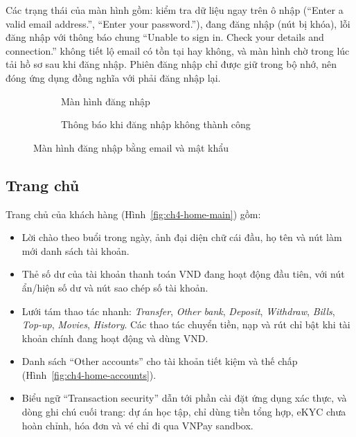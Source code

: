 Các trạng thái của màn hình gồm: kiểm tra dữ liệu ngay trên ô nhập (``Enter a valid email address.'', ``Enter your password.''), đang đăng nhập (nút bị khóa), lỗi đăng nhập với thông báo chung ``Unable to sign in. Check your details and connection.'' không tiết lộ email có tồn tại hay không, và màn hình chờ trong lúc tải hồ sơ sau khi đăng nhập. Phiên đăng nhập chỉ được giữ trong bộ nhớ, nên đóng ứng dụng đồng nghĩa với phải đăng nhập lại.

\begin{figure}[H]
\centering
\begin{subfigure}[t]{0.4\textwidth}
  \centering
  \caption{Màn hình đăng nhập}
  \label{fig:ch4-sign-in-default}
\end{subfigure}\hspace{0.05\textwidth}%
\begin{subfigure}[t]{0.4\textwidth}
  \centering
  \caption{Thông báo khi đăng nhập không thành công}
  \label{fig:ch4-sign-in-error}
\end{subfigure}
\caption{Màn hình đăng nhập bằng email và mật khẩu}
\label{fig:ch4-sign-in}
\end{figure}

\subsection{Trang chủ}
\label{sec:ch4-home}

Trang chủ của khách hàng (Hình~\ref{fig:ch4-home-main}) gồm:
\begin{itemize}
  \item Lời chào theo buổi trong ngày, ảnh đại diện chữ cái đầu, họ tên và nút làm mới danh sách tài khoản.
  \item Thẻ số dư của tài khoản thanh toán VND đang hoạt động đầu tiên, với nút ẩn/hiện số dư và nút sao chép số tài khoản.
  \item Lưới tám thao tác nhanh: \textit{Transfer}, \textit{Other bank}, \textit{Deposit}, \textit{Withdraw}, \textit{Bills}, \textit{Top-up}, \textit{Movies}, \textit{History}. Các thao tác chuyển tiền, nạp và rút chỉ bật khi tài khoản chính đang hoạt động và dùng VND.
  \item Danh sách ``Other accounts'' cho tài khoản tiết kiệm và thế chấp (Hình~\ref{fig:ch4-home-accounts}).
  \item Biểu ngữ ``Transaction security'' dẫn tới phần cài đặt ứng dụng xác thực, và dòng ghi chú cuối trang: dự án học tập, chỉ dùng tiền tổng hợp, eKYC chưa hoàn chỉnh, hóa đơn và vé chỉ đi qua VNPay sandbox.
\end{itemize}

